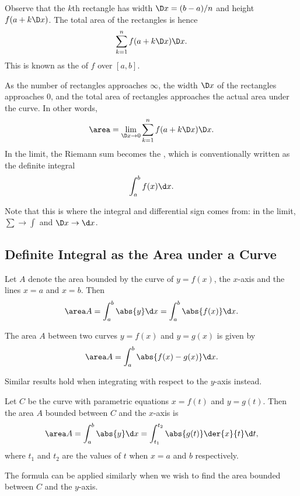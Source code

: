 Observe that the $k$th rectangle has width $\D x = (b-a)/n$ and height $f(a + k \D x)$. The total area of the rectangles is hence \[\sum_{k = 1}^n f(a + k \D x) \D x.\] This is known as the  of $f$ over $[a, b]$.

As the number of rectangles approaches $\infty$, the width $\D x$ of the rectangles approaches 0, and the total area of rectangles approaches the actual area under the curve. In other words, \[\area = \lim_{\D x \to 0} \sum_{k = 1}^n f(a + k \D x) \D x.\] In the limit, the Riemann sum becomes the , which is conventionally written as the definite integral \[\int_a^b f(x) \d x.\]

Note that this is where the integral and differential sign comes from: in the limit, $\sum \to \int$ and $\D x \to \d x$.

\subsection{Definite Integral as the Area under a Curve}

\begin{proposition}
    Let $A$ denote the area bounded by the curve of $y = f(x)$, the $x$-axis and the lines $x = a$ and $x = b$. Then \[\area A = \int_a^b \abs{y} \d x = \int_a^b \abs{f(x)} \d x.\]
\end{proposition}

\begin{proposition}
    The area $A$ between two curves $y = f(x)$ and $y = g(x)$ is given by \[\area A = \int_a^b \abs{f(x) - g(x)} \d x.\]
\end{proposition}

Similar results hold when integrating with respect to the $y$-axis instead.

\begin{proposition}
    Let $C$ be the curve with parametric equations $x = f(t)$ and $y = g(t)$. Then the area $A$ bounded between $C$ and the $x$-axis is \[\area A = \int_a^b \abs{y} \d x = \int_{t_1}^{t_2} \abs{g(t)} \der{x}{t} \d t,\] where $t_1$ and $t_2$ are the values of $t$ when $x = a$ and $b$ respectively.
\end{proposition}

The formula can be applied similarly when we wish to find the area bounded between $C$ and the $y$-axis.

